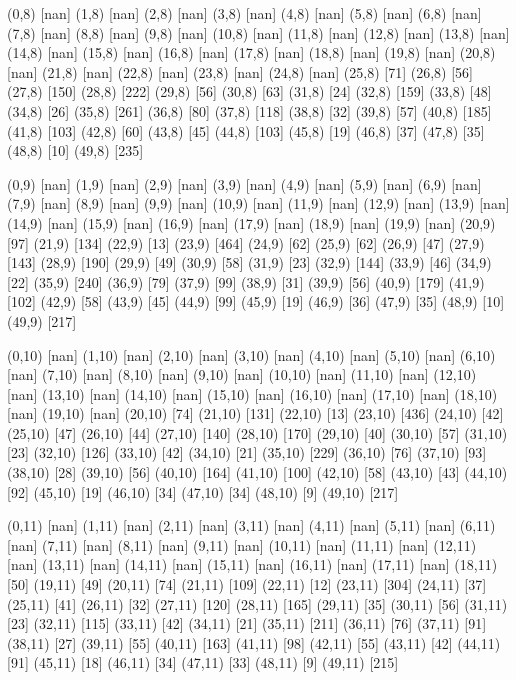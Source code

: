 {(0,8) [nan] (1,8) [nan] (2,8) [nan] (3,8) [nan] (4,8) [nan] (5,8) [nan] (6,8) [nan] (7,8) [nan] (8,8) [nan] (9,8) [nan] (10,8) [nan] (11,8) [nan] (12,8) [nan] (13,8) [nan] (14,8) [nan] (15,8) [nan] (16,8) [nan] (17,8) [nan] (18,8) [nan] (19,8) [nan] (20,8) [nan] (21,8) [nan] (22,8) [nan] (23,8) [nan] (24,8) [nan] (25,8) [71] (26,8) [56] (27,8) [150] (28,8) [222] (29,8) [56] (30,8) [63] (31,8) [24] (32,8) [159] (33,8) [48] (34,8) [26] (35,8) [261] (36,8) [80] (37,8) [118] (38,8) [32] (39,8) [57] (40,8) [185] (41,8) [103] (42,8) [60] (43,8) [45] (44,8) [103] (45,8) [19] (46,8) [37] (47,8) [35] (48,8) [10] (49,8) [235] 

(0,9) [nan] (1,9) [nan] (2,9) [nan] (3,9) [nan] (4,9) [nan] (5,9) [nan] (6,9) [nan] (7,9) [nan] (8,9) [nan] (9,9) [nan] (10,9) [nan] (11,9) [nan] (12,9) [nan] (13,9) [nan] (14,9) [nan] (15,9) [nan] (16,9) [nan] (17,9) [nan] (18,9) [nan] (19,9) [nan] (20,9) [97] (21,9) [134] (22,9) [13] (23,9) [464] (24,9) [62] (25,9) [62] (26,9) [47] (27,9) [143] (28,9) [190] (29,9) [49] (30,9) [58] (31,9) [23] (32,9) [144] (33,9) [46] (34,9) [22] (35,9) [240] (36,9) [79] (37,9) [99] (38,9) [31] (39,9) [56] (40,9) [179] (41,9) [102] (42,9) [58] (43,9) [45] (44,9) [99] (45,9) [19] (46,9) [36] (47,9) [35] (48,9) [10] (49,9) [217] 

(0,10) [nan] (1,10) [nan] (2,10) [nan] (3,10) [nan] (4,10) [nan] (5,10) [nan] (6,10) [nan] (7,10) [nan] (8,10) [nan] (9,10) [nan] (10,10) [nan] (11,10) [nan] (12,10) [nan] (13,10) [nan] (14,10) [nan] (15,10) [nan] (16,10) [nan] (17,10) [nan] (18,10) [nan] (19,10) [nan] (20,10) [74] (21,10) [131] (22,10) [13] (23,10) [436] (24,10) [42] (25,10) [47] (26,10) [44] (27,10) [140] (28,10) [170] (29,10) [40] (30,10) [57] (31,10) [23] (32,10) [126] (33,10) [42] (34,10) [21] (35,10) [229] (36,10) [76] (37,10) [93] (38,10) [28] (39,10) [56] (40,10) [164] (41,10) [100] (42,10) [58] (43,10) [43] (44,10) [92] (45,10) [19] (46,10) [34] (47,10) [34] (48,10) [9] (49,10) [217] 

(0,11) [nan] (1,11) [nan] (2,11) [nan] (3,11) [nan] (4,11) [nan] (5,11) [nan] (6,11) [nan] (7,11) [nan] (8,11) [nan] (9,11) [nan] (10,11) [nan] (11,11) [nan] (12,11) [nan] (13,11) [nan] (14,11) [nan] (15,11) [nan] (16,11) [nan] (17,11) [nan] (18,11) [50] (19,11) [49] (20,11) [74] (21,11) [109] (22,11) [12] (23,11) [304] (24,11) [37] (25,11) [41] (26,11) [32] (27,11) [120] (28,11) [165] (29,11) [35] (30,11) [56] (31,11) [23] (32,11) [115] (33,11) [42] (34,11) [21] (35,11) [211] (36,11) [76] (37,11) [91] (38,11) [27] (39,11) [55] (40,11) [163] (41,11) [98] (42,11) [55] (43,11) [42] (44,11) [91] (45,11) [18] (46,11) [34] (47,11) [33] (48,11) [9] (49,11) [215] 

}
